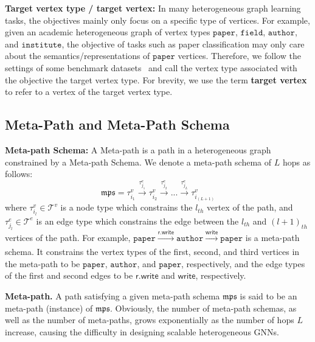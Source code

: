 \documentclass[lettersize,journal]{IEEEtran}
\begin{document}
\textbf{Target vertex type / target vertex: } In many heterogeneous graph learning tasks, the objectives mainly only focus on a specific type of vertices.
For example, given an academic heterogeneous graph of vertex types $\mathtt{paper}$, $\mathtt{field}$, $\mathtt{author}$, and $\mathtt{institute}$, the objective of tasks such as paper classification may only care about the semantics/representations of $\mathtt{paper}$ vertices.
Therefore, we follow the settings of some benchmark datasets~\cite{DBLP:conf/kdd/LvDLCFHZJDT21,DBLP:conf/nips/HuFZDRLCL20} and call the vertex type associated with the objective the target vertex type.
For brevity, we use the term \textbf{target vertex} to refer to a vertex of the target vertex type.





\subsection{Meta-Path and Meta-Path Schema}\label{sec:meta_path} 

\textbf{Meta-path Schema:}
A Meta-path is a path in a heterogeneous graph constrained by a Meta-path Schema.
We denote a meta-path schema of $L$ hops as follows:
\begin{equation}
    \mathfrak{mps}=\tau^{v}_{i_1} \xrightarrow[]{\tau^{e}_{j_1}} \tau^{v}_{i_2} \xrightarrow[]{\tau^{e}_{j_2}} ...\xrightarrow[]{\tau^{e}_{j_{L}}} \tau^{v}_{i_{(L+1)}}
\end{equation}
where $\tau^{v}_{i_l} \in \mathcal{T}^v$ is a node type which constrains the $l_{th}$ vertex of the path, and $\tau^{e}_{j_l} \in \mathcal{T}^e$ is an edge type which constrains the edge between the $l_{th}$ and $(l+1)_{th}$ vertices of the path.
For example, $\mathtt{paper} \xrightarrow[]{\mathsf{r.write}} \mathtt{author} \xrightarrow[]{\mathsf{write}} \mathtt{paper}$ is a meta-path schema.
It constrains the vertex types of the first, second, and third vertices in the meta-path to be $\mathtt{paper}$, $\mathtt{author}$, and $\mathtt{paper}$, respectively, and the edge types of the first and second edges to be $\mathsf{r.write}$ and $\mathsf{write}$, respectively.  


\textbf{Meta-path.}
A path satisfying a given meta-path schema $\mathfrak{mps}$ is said to be an meta-path (instance) of $\mathfrak{mps}$.
Obviously, the number of meta-path schemas, as well as the number of meta-paths, grows exponentially as the number of hops $L$ increase, causing the difficulty in designing scalable heterogeneous GNNs.
\end{document}
